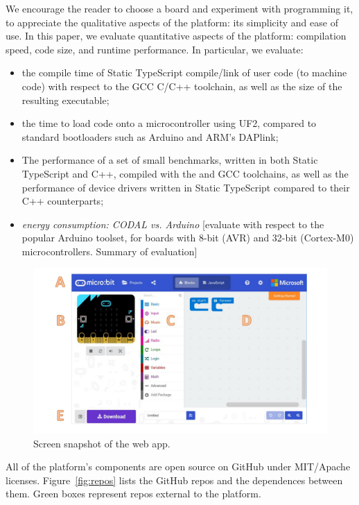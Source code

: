 We encourage the reader to choose a board and experiment with programming it, to appreciate the 
qualitative aspects of the platform: its simplicity and ease of use.  In this 
paper, we evaluate quantitative aspects of the platform: 
compilation speed, code size, and runtime performance.  In particular, we evaluate:
\begin{itemize}
\item the compile time of Static TypeScript compile/link of user code (to machine code) with respect 
      to the GCC C/C++ toolchain, as well as the size of the resulting executable;
\item the time to load code onto a microcontroller using UF2, compared to standard bootloaders
      such as Arduino and ARM's DAPlink; 
\item The performance of a set of small benchmarks, written in both Static TypeScript and C++,
      compiled with the \MC and GCC toolchains, as well as the performance of device drivers
      written in Static TypeScript compared to their C++ counterparts;
\item \emph{energy consumption: CODAL vs. Arduino}
[evaluate with respect to the popular Arduino toolset, for boards with 8-bit (AVR) and 32-bit (Cortex-M0) microcontrollers. 
Summary of evaluation]
\end{itemize}

\begin{figure}[t]
      \includegraphics[width=5in]{screenSnapFig.pdf}
  \caption{\label{fig:screenSnap}Screen snapshot of the \MC web app.}
\end{figure}

All of the platform's components are open source on GitHub under MIT/Apache licenses. 
Figure~\ref{fig:repos} lists the GitHub repos and the dependences between them. Green
boxes represent repos external to the platform.

